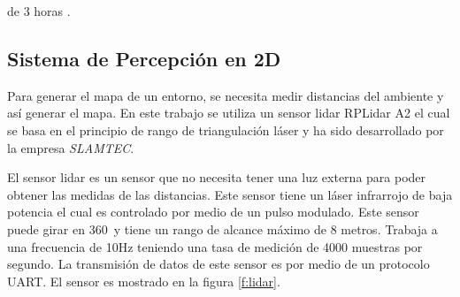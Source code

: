 de 3 horas \cite{aboutKobuki}.


\subsection{Sistema de Percepci\'on en 2D}
Para generar el mapa de un entorno, se necesita medir distancias del ambiente y así
generar el mapa. En este trabajo se utiliza un sensor lidar RPLidar A2 el cual se basa en 
el principio de rango de triangulación láser \cite{amann2001laser} y ha sido desarrollado 
por la empresa \textit{SLAMTEC}.

El sensor lidar es un sensor que no necesita tener una luz externa para poder obtener las
medidas de las distancias. Este sensor tiene un láser infrarrojo de baja potencia el cual
es controlado por medio de un pulso modulado. Este sensor puede girar en 360\grad ~y tiene
un rango de alcance máximo de 8 metros. Trabaja a una frecuencia de 10Hz teniendo una tasa 
de medición de 4000 muestras por segundo. La transmisión de datos de este sensor es por 
medio de un protocolo UART. El sensor es mostrado en la figura \ref{f:lidar}.


